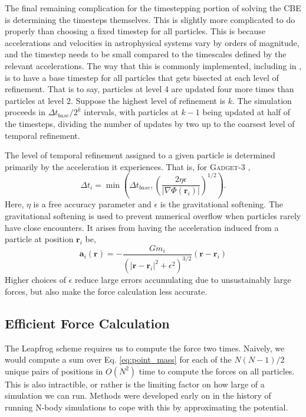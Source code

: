 The final remaining complication for the timestepping portion of solving the CBE is determining the timesteps themselves. This is slightly more complicated to do properly than choosing a fixed timestep for all particles. This is because accelerations and velocities in astrophysical systems vary by orders of magnitude, and the timestep needs to be small compared to the timescales defined by the relevant accelerations. The way that this is commonly implemented, including in \citet{GadgetCodePaper}, is to have a base timestep for all particles that gets bisected at each level of refinement. That is to say, particles at level 4 are updated four more times than particles at level 2. Suppose the highest level of refinement is $k$. The simulation proceeds in $\Delta t_{base} / 2^{k}$ intervals, with particles at $k - 1$ being updated at half of the timesteps, dividing the number of updates by two up to the coarsest level of temporal refinement.

The level of temporal refinement assigned to a given particle is determined primarily by the acceleration it experiences. That is, for \textsc{Gadget-3} \citep{GadgetCodePaper},
\begin{equation}
\Delta t_i = \min\left(\Delta t_{base}, \left(\frac{2 \eta \epsilon}{\vert \nabla \Phi(\textbf{r}_i) \vert} \right)^{1/2}\right).
\end{equation}
Here, $\eta$ is a free accuracy parameter and $\epsilon$ is the gravitational softening. The gravitational softening is used to prevent numerical overflow when particles rarely have close encounters. It arises from having the acceleration induced from a particle at position $\textbf{r}_i$  be,
\begin{equation}
\textbf{a}_i(\textbf{r}) = -\frac{G m_i}{\left(\vert\textbf{r} - \textbf{r}_i\vert^2 + \epsilon^2\right)^{3/2}}(\textbf{r} - \textbf{r}_i) \label{eq:point_mass}
\end{equation}
Higher choices of $\epsilon$ reduce large errors accumulating due to unsustainably large forces, but also make the force calculation less accurate.

\subsection{Efficient Force Calculation}

The Leapfrog scheme requires us to compute the force two times. Naively, we would compute a sum over Eq. \eqref{eq:point_mass} for each of the $N(N-1)/2$ unique pairs of positions in $O(N^2)$ time to compute the forces on all particles. This is also intractible, or rather is the limiting factor on how large of a simulation we can run. Methods were developed early on in the history of running N-body simulations to cope with this by approximating the potential.

